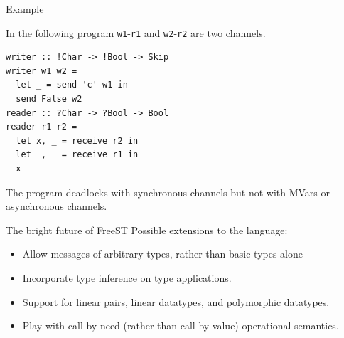 \documentclass[10pt]{beamer}
\begin{document}


\begin{frame}[fragile]{Example}

In the following program
\lstinline|w1|-\lstinline|r1| and \lstinline|w2|-\lstinline|r2| are
two channels.
%
\begin{lstlisting}
writer :: !Char -> !Bool -> Skip
writer w1 w2 =
  let _ = send 'c' w1 in
  send False w2
reader :: ?Char -> ?Bool -> Bool
reader r1 r2 =
  let x, _ = receive r2 in
  let _, _ = receive r1 in
  x
\end{lstlisting}
%
The program deadlocks with synchronous channels but not with MVars or
asynchronous channels.	
\end{frame}

\begin{frame}[fragile]{The bright future of FreeST}
Possible extensions to the language:
\begin{itemize}
	\item Allow messages of arbitrary types, rather than basic
          types alone %
	\item Incorporate type inference on type applications.
	\item Support for linear pairs, linear datatypes, and polymorphic datatypes.
	\item Play with call-by-need (rather than call-by-value) operational semantics.
\end{itemize}

	
\end{frame}

\end{document}
